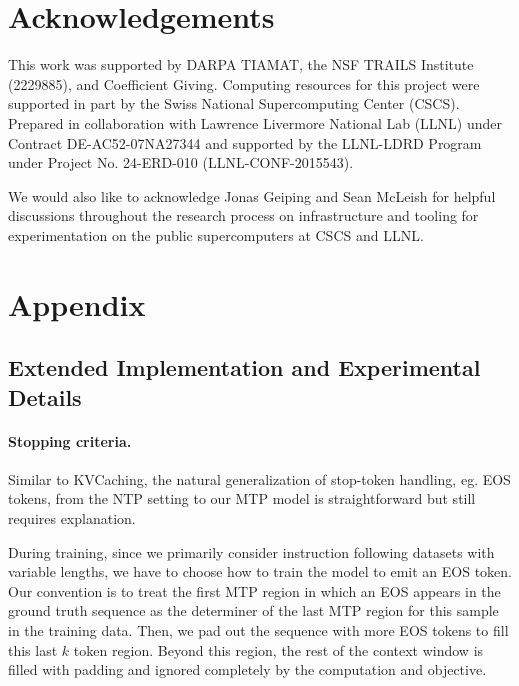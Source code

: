\documentclass{article}
\theoremstyle{plain}
\theoremstyle{definition}
\theoremstyle{remark}
\begin{document}
\section*{Acknowledgements}

This work was supported by DARPA TIAMAT, the NSF TRAILS Institute (2229885), and Coefficient Giving. Computing resources for this project were supported in part by the Swiss National Supercomputing Center (CSCS).  Prepared in collaboration with Lawrence Livermore National Lab (LLNL) under Contract DE-AC52-07NA27344 and supported by the LLNL-LDRD Program under Project No. 24-ERD-010 (LLNL-CONF-2015543).

We would also like to acknowledge Jonas Geiping and Sean McLeish for helpful discussions throughout the research process on infrastructure and tooling for experimentation on the public supercomputers at CSCS and LLNL.




\newpage
\appendix
\onecolumn

\section{Appendix}

\subsection{Extended Implementation and Experimental Details}\label{app:impl-exp-details}

\paragraph{Stopping criteria.}

Similar to KVCaching, the natural generalization of stop-token handling, eg. EOS tokens, from the NTP setting to our MTP model is straightforward but still requires explanation. 

During training, since we primarily consider instruction following datasets with variable lengths, we have to choose how to train the model to emit an EOS token. Our convention is to treat the first MTP region in which an EOS appears in the ground truth sequence as the determiner of the last MTP region for this sample in the training data. Then, we pad out the sequence with more EOS tokens to fill this last $k$ token region. Beyond this region, the rest of the context window is filled with padding and ignored completely by the computation and objective. 
\end{document}
